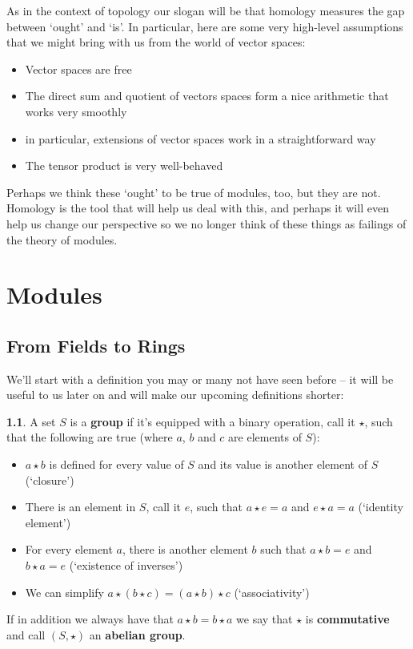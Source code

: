 \documentclass[oneside,english]{amsbook}
\numberwithin{section}{chapter}
\theoremstyle{plain}
\theoremstyle{definition}
\newtheorem{defn}[thm]{\protect\definitionname}
\providecommand{\definitionname}{Definition}
\begin{document}
			As in the context of topology our slogan will be that homology measures the gap between `ought' and `is'. In particular, here are some very high-level assumptions that we might bring with us from the world of vector spaces:
			
			\begin{itemize}
				\item Vector spaces are free
				\item The direct sum and quotient of vectors spaces form a nice arithmetic that works very smoothly
				\item in particular, extensions of vector spaces work in a straightforward way
				\item The tensor product is very well-behaved
			\end{itemize}
			
			Perhaps we think these `ought' to be true of modules, too, but they are not. Homology is the tool that will help us deal with this, and perhaps it will even help us change our perspective so we no longer think of these things as failings of the theory of modules.

	\chapter{Modules}
		
		\section{From Fields to Rings}
				
			We'll start with a definition you may or many not have seen before -- it will be useful to us later on and will make our upcoming definitions shorter:
			
			\begin{defn}
				A set $S$ is a \textbf{group} if it's equipped with a binary operation, call it $\star$, such that the following are true (where $a$, $b$ and $c$ are elements of $S$):
				\begin{itemize}
					\item $a\star b$ is defined for every value of $S$ and its value is another element of $S$ (`closure')
					\item There is an element in $S$, call it $e$, such that $a\star e = a$ and $e\star a = a$ (`identity element')
					\item For every element $a$, there is another element $b$ such that $a\star b = e$ and $b\star a = e$ (`existence of inverses')
					\item We can simplify $a\star (b\star c) = (a\star b)\star c$ (`associativity')
				\end{itemize}
				If in addition we always have that $a\star b = b\star a$ we say that $\star$ is \textbf{commutative} and call $(S, \star)$ an \textbf{abelian group}.
			\end{defn}
			
\end{document}
